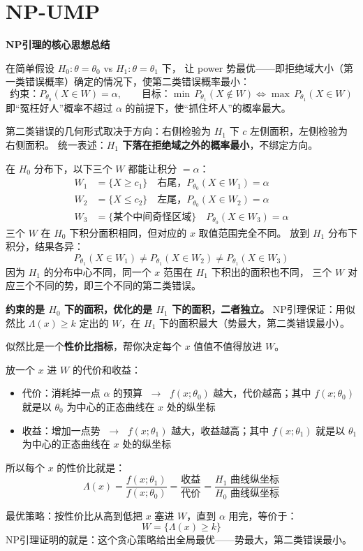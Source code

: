 \section{NP-UMP}
 \textbf{NP引理的核心思想总结}
\begin{note}[奈曼皮尔逊]
在简单假设 $H_0: \theta = \theta_0$ vs $H_1: \theta = \theta_1$ 下，
让 power 势最优——即拒绝域大小（第一类错误概率）确定的情况下，使第二类错误概率最小：
\[
\text{约束：} P_{\theta_0}(X \in W) = \alpha, \qquad
\text{目标：} \min\, P_{\theta_1}(X \notin W)
\iff \max\, P_{\theta_1}(X \in W)
\]
即``冤枉好人''概率不超过 $\alpha$ 的前提下，使``抓住坏人''的概率最大。

第二类错误的几何形式取决于方向：右侧检验为 $H_1$ 下 $c$ 左侧面积，左侧检验为右侧面积。
统一表述：\textbf{$H_1$ 下落在拒绝域之外的概率最小}，不绑定方向。
\end{note}
\begin{dxtips}
    在 $H_0$ 分布下，以下三个 $W$ 都能让积分 $= \alpha$：
\begin{align*}
W_1 &= \{X \geq c_1\} \quad \text{右尾，} P_{\theta_0}(X \in W_1) = \alpha \\
W_2 &= \{X \leq c_2\} \quad \text{左尾，} P_{\theta_0}(X \in W_2) = \alpha \\
W_3 &= \{\text{某个中间奇怪区域}\} \quad P_{\theta_0}(X \in W_3) = \alpha
\end{align*}
三个 $W$ 在 $H_0$ 下积分面积相同，但对应的 $x$ 取值范围完全不同。
放到 $H_1$ 分布下积分，结果各异：
\[
P_{\theta_1}(X \in W_1) \neq P_{\theta_1}(X \in W_2) \neq P_{\theta_1}(X \in W_3)
\]
因为 $H_1$ 的分布中心不同，同一个 $x$ 范围在 $H_1$ 下积出的面积也不同，
三个 $W$ 对应三个不同的势，即三个不同的第二类错误。

\textbf{约束的是 $H_0$ 下的面积，优化的是 $H_1$ 下的面积，二者独立。}
NP引理保证：用似然比 $\Lambda(x) \geq k$ 定出的 $W$，在 $H_1$ 下的面积最大（势最大，第二类错误最小）。
\end{dxtips}
\begin{note}
    似然比是一个\textbf{性价比指标}，帮你决定每个 $x$ 值值不值得放进 $W$。

放一个 $x$ 进 $W$ 的代价和收益：
\begin{itemize}
    \item 代价：消耗掉一点 $\alpha$ 的预算 $\;\to\;$ $f(x;\theta_0)$ 越大，代价越高；其中 $f(x;\theta_0)$ 就是以 $\theta_0$ 为中心的正态曲线在 $x$ 处的纵坐标
    \item 收益：增加一点势 $\;\to\;$ $f(x;\theta_1)$ 越大，收益越高；其中 $f(x;\theta_1)$ 就是以 $\theta_1$ 为中心的正态曲线在 $x$ 处的纵坐标
\end{itemize}

所以每个 $x$ 的性价比就是：
\[
\Lambda(x) = \frac{f(x;\theta_1)}{f(x;\theta_0)} = \frac{\text{收益}}{\text{代价}}
= \frac{H_1\text{ 曲线纵坐标}}{H_0\text{ 曲线纵坐标}}
\]

最优策略：按性价比从高到低把 $x$ 塞进 $W$，直到 $\alpha$ 用完，等价于：
\[
W = \{\Lambda(x) \geq k\}
\]
NP引理证明的就是：这个贪心策略给出全局最优——势最大，第二类错误最小。
\end{note}
